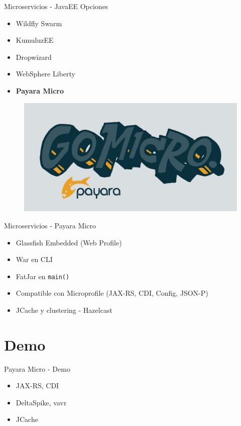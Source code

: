 \documentclass{beamer}
\begin{document}
\begin{frame}{Microservicios - JavaEE}
Opciones
\begin{itemize}
	\item Wildfly Swarm
	\item KumuluzEE
	\item Dropwizard
	\item WebSphere Liberty
	\item \textbf{Payara Micro}
\end{itemize}

\begin{figure}
	\centering
	\includegraphics[width=0.5\linewidth]{Images/payaramicro}
\end{figure}
\end{frame}

\begin{frame}{Microservicios - Payara Micro}
\begin{itemize}
	\item Glassfish Embedded (Web Profile)
	\item War en CLI
	\item FatJar en \texttt{main()}
	\item Compatible con Microprofile (JAX-RS, CDI, Config, JSON-P)
	\item JCache y clustering - Hazelcast
\end{itemize}
\end{frame}

\section{Demo}
\begin{frame}{Payara Micro - Demo}
\begin{itemize}
	\item JAX-RS, CDI
	\item DeltaSpike, vavr
	\item JCache
\end{itemize}
\end{frame}
\end{document}
